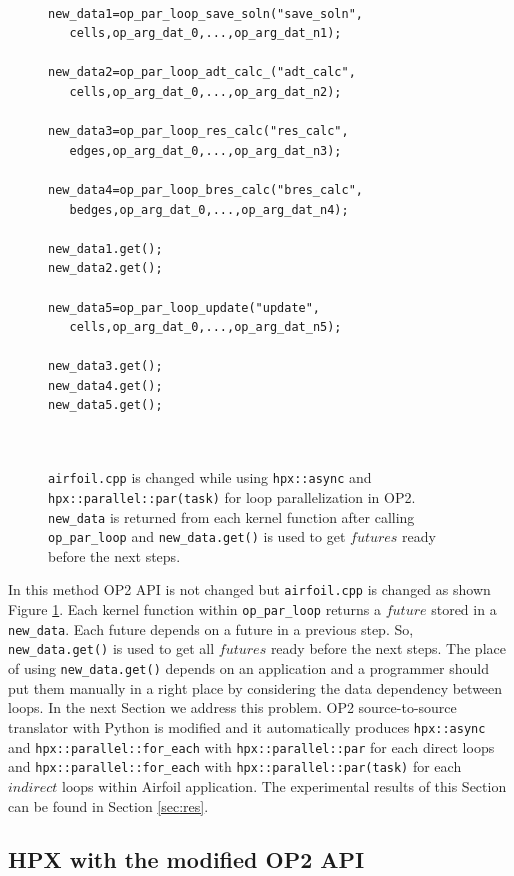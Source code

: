 \documentclass[conference]{IEEEtran}
\begin{document}
\begin{figure} [!h]
    \begin{lstlisting}   

new_data1=op_par_loop_save_soln("save_soln",
   cells,op_arg_dat_0,...,op_arg_dat_n1);
  
new_data2=op_par_loop_adt_calc_("adt_calc",
   cells,op_arg_dat_0,...,op_arg_dat_n2);
   
new_data3=op_par_loop_res_calc("res_calc",
   edges,op_arg_dat_0,...,op_arg_dat_n3);
 
new_data4=op_par_loop_bres_calc("bres_calc",
   bedges,op_arg_dat_0,...,op_arg_dat_n4);
   
new_data1.get();
new_data2.get();  
 
new_data5=op_par_loop_update("update",
   cells,op_arg_dat_0,...,op_arg_dat_n5);

new_data3.get();
new_data4.get();
new_data5.get();

    
    \end{lstlisting}
    \caption{\small{\texttt{airfoil.cpp} is changed while using \texttt{hpx::async} and \texttt{hpx::parallel::par(task)} for loop parallelization in OP2. \texttt{new\_data} is returned from each kernel function after calling \texttt{op\_par\_loop} and \texttt{new\_data.get()} is used to get $futures$ ready before the next steps.}}
    \label{l4}
\end{figure}


In this method OP2 API is not changed but \texttt{airfoil.cpp} is changed as shown Figure \ref{l4}. Each kernel function within \texttt{op\_par\_loop} returns a $future$ stored in a \texttt{new\_data}. Each future depends on a future in a previous step. So, \texttt{new\_data.get()} is used to get all $futures$ ready before the next steps. The place of using \texttt{new\_data.get()} depends on an application and a programmer should put them manually in a right place by considering the data dependency between loops. In the next Section we address this problem. OP2 source-to-source translator with Python is modified and it automatically produces \texttt{hpx::async} and \texttt{hpx::parallel::for\_each} with \texttt{hpx::parallel::par} for each direct loops and \texttt{hpx::parallel::for\_each} with \texttt{hpx::parallel::par(task)} for each $indirect$ loops within Airfoil application. The experimental results of this Section can be found in Section \ref{sec:res}.



\subsection{\textbf{HPX with the modified OP2 API}}
\label{sec:with}
\end{document}
